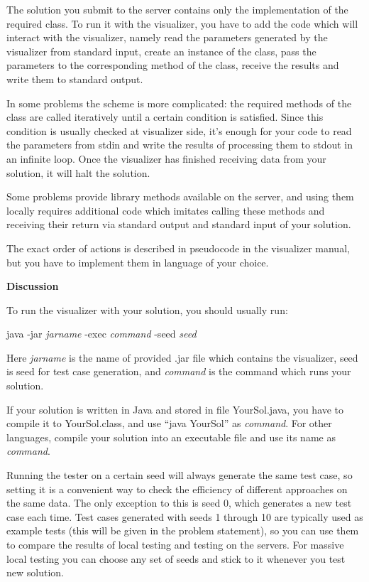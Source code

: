 The solution you submit to the server contains only the implementation
of the required class. To run it with the visualizer, you have to add
the code which will interact with the visualizer, namely read the
parameters generated by the visualizer from standard input, create an
instance of the class, pass the parameters to the corresponding method
of the class, receive the results and write them to standard output.

In some problems the scheme is more complicated: the required methods of
the class are called iteratively until a certain condition is satisfied.
Since this condition is usually checked at visualizer side, it's enough
for your code to read the parameters from stdin and write the results of
processing them to stdout in an infinite loop. Once the visualizer has
finished receiving data from your solution, it will halt the solution.

Some problems provide library methods available on the server, and using
them locally requires additional code which imitates calling these
methods and receiving their return via standard output and standard
input of your solution.

The exact order of actions is described in pseudocode in the visualizer
manual, but you have to implement them in language of your choice.

\textbf{Discussion}

To run the visualizer with your solution, you should usually run:

java -jar \emph{jarname} -exec \emph{command} -seed \emph{seed}

Here \emph{jarname} is the name of provided .jar file which contains the
visualizer, seed is seed for test case generation, and \emph{command} is
the command which runs your solution.

If your solution is written in Java and stored in file YourSol.java, you
have to compile it to YourSol.class, and use ``java YourSol'' as
\emph{command}. For other languages, compile your solution into an
executable file and use its name as \emph{command}.

Running the tester on a certain seed will always generate the same test
case, so setting it is a convenient way to check the efficiency of
different approaches on the same data. The only exception to this is
seed 0, which generates a new test case each time. Test cases generated
with seeds 1 through 10 are typically used as example tests (this will
be given in the problem statement), so you can use them to compare the
results of local testing and testing on the servers. For massive local
testing you can choose any set of seeds and stick to it whenever you
test new solution.


